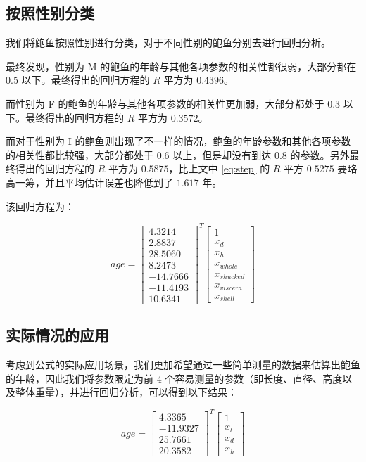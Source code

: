 \subsection{按照性别分类}

我们将鲍鱼按照性别进行分类，对于不同性别的鲍鱼分别去进行回归分析。

最终发现，性别为 M 的鲍鱼的年龄与其他各项参数的相关性都很弱，大部分都在 $0.5$ 以下。最终得出的回归方程的 $R$ 平方为 $0.4396$。

而性别为 F 的鲍鱼的年龄与其他各项参数的相关性更加弱，大部分都处于 $0.3$ 以下。最终得出的回归方程的 $R$ 平方为 $0.3572$。

而对于性别为 I 的鲍鱼则出现了不一样的情况，鲍鱼的年龄参数和其他各项参数的相关性都比较强，大部分都处于 $0.6$ 以上，但是却没有到达 $0.8$ 的参数。另外最终得出的回归方程的 $R$ 平方为 $0.5875$，比上文中 \ref{eq:step} 的 $R$ 平方 $0.5275$ 要略高一筹，并且平均估计误差也降低到了 $1.617$ 年。

该回归方程为：

\begin{equation} \label{eq:sex_i}
  age = \begin{bmatrix} 4.3214 \\   2.8837 \\   28.5060 \\   8.2473 \\ -14.7666 \\ -11.4193 \\  10.6341 \end{bmatrix} ^{T} \begin{bmatrix} 1 \\ x_d \\ x_h \\ x_{whole} \\ x_{shucked} \\ x_{viscera} \\ x_{shell} \end{bmatrix}
\end{equation}

\subsection{实际情况的应用}

考虑到公式的实际应用场景，我们更加希望通过一些简单测量的数据来估算出鲍鱼的年龄，因此我们将参数限定为前 $4$ 个容易测量的参数（即长度、直径、高度以及整体重量），并进行回归分析，可以得到以下结果：

\begin{equation} \label{eq:real}
  age = \begin{bmatrix} 4.3365 \\ -11.9327 \\ 25.7661 \\ 20.3582 \end{bmatrix} ^{T} \begin{bmatrix} 1 \\ x_l \\ x_d \\ x_h \end{bmatrix}
\end{equation}

